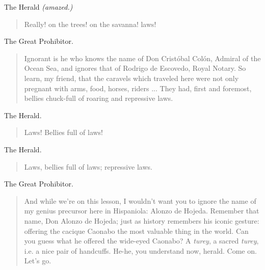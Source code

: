 \documentclass[letterpaper,article,12pt,oneside,notitlepage]{memoir}
\begin{document}
\begin{center}The Herald \textit{(amazed.)}\end{center}

\begin{verse}
Really! on the trees! on the savanna! laws! \\
\end{verse}

\begin{center}The Great Prohibitor.\end{center}

\begin{verse}
Ignorant is he who knows the name of Don Cristóbal Colón, Admiral of the Ocean Sea, and ignores that of Rodrigo de Escovedo, Royal Notary. So learn, my friend, that the caravels which traveled here were not only pregnant with arms, food, horses, riders ... They had, first and foremost, bellies chuck-full of roaring and repressive laws.  \\
\end{verse}

\clearpage

\begin{center}The Herald.\end{center}

\begin{verse}
\hspace{1cm} Laws! Bellies full of laws! \\
\end{verse}

\begin{center}The Herald.\end{center}

\begin{verse}
\hspace{1cm} Laws, bellies full of laws; repressive laws. \\
\end{verse}

\begin{center}The Great Prohibitor.\end{center}

\begin{verse}
And while we're on this lesson, I wouldn't want you to ignore the name of my genius precursor here in Hispaniola: Alonzo de Hojeda. Remember that name, Don Alonzo de Hojeda; just as history remembers his iconic gesture: offering the cacique Caonabo the most valuable thing in the world. Can you guess what he offered the wide-eyed Caonabo? A \textit{turey}, a sacred \textit{turey}, i.e. a nice pair of handcuffs. He-he, you understand now, herald. Come on. Let's go.  \\
\end{verse}
\end{document}
